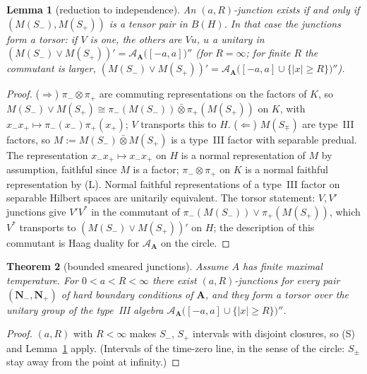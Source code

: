 \documentclass[11pt]{article}
\newtheorem{theorem}{Theorem}[section]
\newtheorem{lemma}[theorem]{Lemma}
\theoremstyle{definition}
\theoremstyle{remark}
\newcommand{\cA}{\mathcal A}
\newcommand{\bfA}{\mathbf A}
\begin{document}
\begin{lemma}[reduction to independence]\label{lem:reduction}
An $(a,R)$-junction exists if and only if $(M(S_-),M(S_+))$ is a tensor pair in $B(H)$. In that case the junctions form a torsor: if $V$ is one, the others are $V u$, $u$ a unitary in $(M(S_-)\vee M(S_+))'=\cA_{\bfA}\big([-a,a]\big)''$ (for $R=\infty$; for finite $R$ the commutant is larger, $(M(S_-)\vee M(S_+))'=\cA_{\bfA}\big([-a,a]\cup\{|x|\ge R\}\big)''$).
\end{lemma}
\begin{proof}
($\Rightarrow$) $\pi_-\otimes\pi_+$ are commuting representations on the factors of $K$, so $M(S_-)\vee M(S_+)\cong\pi_-(M(S_-))\bar\otimes\pi_+(M(S_+))$ on $K$, with $x_-x_+\mapsto\pi_-(x_-)\pi_+(x_+)$; $V$ transports this to $H$. ($\Leftarrow$) $M(S_\mp)$ are type~III factors, so $M:=M(S_-)\bar\otimes M(S_+)$ is a type~III factor with separable predual. The representation $x_-x_+\mapsto x_-x_+$ on $H$ is a normal representation of $M$ by assumption, faithful since $M$ is a factor; $\pi_-\otimes\pi_+$ on $K$ is a normal faithful representation by (L). Normal faithful representations of a type~III factor on separable Hilbert spaces are unitarily equivalent. The torsor statement: $V,V'$ junctions give $V'V^*$ in the commutant of $\pi_-(M(S_-))\vee\pi_+(M(S_+))$, which $V^*$ transports to $(M(S_-)\vee M(S_+))'$ on $H$; the description of this commutant is Haag duality for $\cA_{\bfA}$ on the circle.
\end{proof}

\begin{theorem}[bounded smeared junctions]\label{thm:bounded}
Assume $A$ has finite maximal temperature. For $0<a<R<\infty$ there exist $(a,R)$-junctions for every pair $(\mathbf N_-,\mathbf N_+)$ of hard boundary conditions of $\bfA$, and they form a torsor over the unitary group of the type~III algebra $\cA_{\bfA}\big([-a,a]\cup\{|x|\ge R\}\big)''$.
\end{theorem}
\begin{proof}
$(a,R)$ with $R<\infty$ makes $S_-$, $S_+$ intervals with disjoint closures, so (S) and Lemma~\ref{lem:reduction} apply. (Intervals of the time-zero line, in the sense of the circle: $S_\pm$ stay away from the point at infinity.)
\end{proof}
\end{document}
